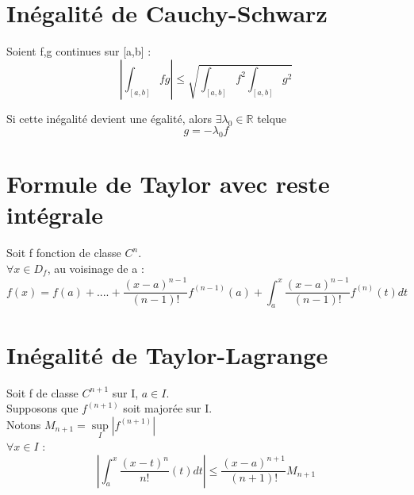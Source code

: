\section{Inégalité de Cauchy-Schwarz}
\begin{de}
Soient f,g continues sur [a,b] : 
$$|\int_{[a,b]}fg| \leq \sqrt{\int_{[a,b]}f^2\int_{[a,b]}g^2}$$
\end{de}
Si cette inégalité devient une égalité, alors $\exists \lambda_0 \in \mathbb{R}$ telque 
$$g = -\lambda_0f$$
\section{Formule de Taylor avec reste intégrale}
\begin{de}
Soit f fonction de classe $C^n$.\\
$\forall x \in D_f$, au voisinage de a :
$$f(x)=f(a)+....+\dfrac{(x-a)^{n-1}}{(n-1)!}f^{(n-1)}(a) + \int_a^x \dfrac{(x-a)^{n-1}}{(n-1)!}f^{(n)}(t)dt$$
\end{de}
\section{Inégalité de Taylor-Lagrange}
\begin{de}
Soit f de classe $C^{n+1}$ sur I, $a \in I$.\\
Supposons que $f^{(n+1)}$ soit majorée sur I.\\
Notons $M_{n+1} = \underset{I}\sup|f^{(n+1)}|$\\
$\forall x \in I$ :
$$|\int_a^x\dfrac{(x-t)^n}{n!}(t)dt| \leq \dfrac{(x-a)^{n+1}}{(n+1)!}M_{n+1}$$
\end{de}


